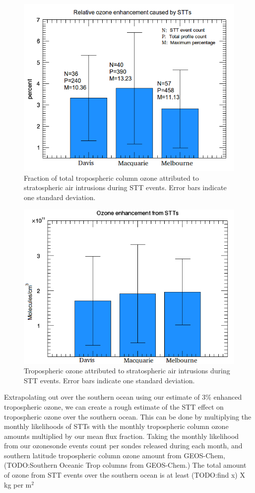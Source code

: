 \documentclass{article}
\begin{document}
  \begin{figure}[!htbp]
    \begin{center}
    \includegraphics[width=0.8\columnwidth]{figures/FluxSummary_notrans.png}
    \caption{Fraction of total tropospheric column ozone attributed to stratospheric air intrusions during STT events. Error bars indicate one standard deviation.}
    \label{fig:fluxsummary}
    \end{center}
  \end{figure}
  \begin{figure}[!htbp]
    \begin{center}
    \includegraphics[width=0.8\columnwidth]{figures/FluxSummaryAbs.png}
    \caption{Tropospheric ozone attributed to stratospheric air intrusions during STT events. Error bars indicate one standard deviation.}
    \label{fig:fluxsummaryabs}
    \end{center}
  \end{figure}
  
  Extrapolating out over the southern ocean using our estimate of 3\% enhanced tropospheric ozone, we can create a rough estimate of the STT effect on tropospheric ozone over the southern ocean.
  This can be done by multiplying the monthly likelihoods of STTs with the monthly tropospheric column ozone amounts multiplied by our mean flux fraction.
  Taking the monthly likelihood from our ozonesonde events count per sondes released during each month, and southern latitude tropospheric column ozone amount from GEOS-Chem,  (TODO:Southern Oceanic Trop columns from GEOS-Chem.)
  The total amount of ozone from STT events over the southern ocean is at least (TODO:find x) X kg per m$^2$ 
\end{document}
